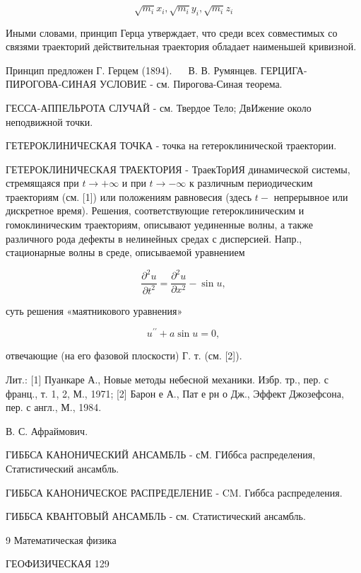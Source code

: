 \documentclass[10pt]{article}
\begin{document}
\[

\sqrt{m_{i}} x_{i}, \sqrt{m_{i}} y_{i}, \sqrt{m_{i}} z_{i}

\]



Иными словами, принцип Герца утверждает, что среди всех совместимых со связями траекторий действительная траектория обладает наименьшей кривизной.



Принцип предложен Г. Герцем (1894). $\quad$ В. В. Румянцев. ГЕРЦИГА-ПИРОГОВА-СИНАЯ УСЛОВИЕ - см. Пирогова-Синая теорема.



ГЕССА-АППЕЛЬРОТА СЛУЧАЙ - см. Твердое Тело; ДвИжение около неподвижной точки.



ГЕТЕРОКЛИНИЧЕСКАЯ ТОЧКА - точка на гетероклинической траектории.



ГЕТЕРОКЛИНИЧЕСКАЯ ТРАЕКТОРИЯ - ТраекТорИЯ динамической системы, стремящаяся при $t \rightarrow+\infty$ и при $t \rightarrow-\infty$ к различным периодическим траекториям (см. [1]) или положениям равновесия (здесь $t-$ непрерывное или дискретное время). Решения, соответствующие гетероклиническим и гомоклиническим траекториям, описывают уединенные волны, а также различного рода дефекты в нелинейных средах с дисперсией. Напр., стационарные волны в среде, описываемой уравнением



\[

\frac{\partial^{2} u}{\partial t^{2}}=\frac{\partial^{2} u}{\partial x^{2}}-\sin u,

\]



суть решения «маятникового уравнения»



\[

u^{\prime \prime}+a \sin u=0,

\]



отвечающие (на его фазовой плоскости) Г. т. (см. [2]).



Лит.: [1] Пуанкаре А., Новые методы небесной механики. Избр. тр., пер. с франц., т. 1, 2, М., 1971; [2] Барон е А., Пат е рн о Дж., Эффект Джозефсона, пер. с англ., М., 1984.



В. С. Афраймович.



ГИББСА КАНОНИЧЕСКИЙ АНСАМБЛЬ - сМ. ГИббса распределения, Статистический ансамбль.



ГИББСА КАНОНИЧЕСКОЕ РАСПРЕДЕЛЕНИЕ - $\mathrm{CM}$. Гиббса распределения.



ГИББСА КВАНТОВЫЙ АНСАМБЛЬ - см. Статистический ансамбль.



9 Математическая физика



ГЕОФИЗИЧЕСКАЯ 129
\end{document}

